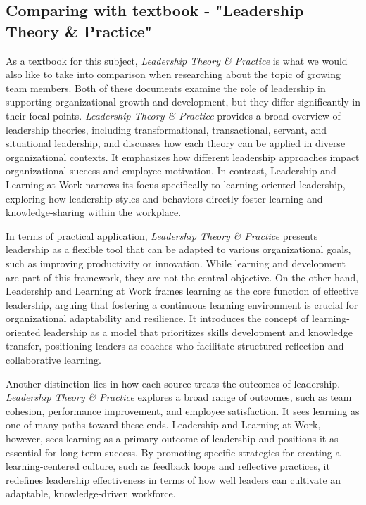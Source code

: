 \subsection{Comparing with textbook - "Leadership Theory \& Practice"}
As a textbook for this subject, \textit{Leadership Theory \& Practice} is what we would also like to
take into comparison when researching about the topic of growing team members. Both of these
documents examine the role of leadership in supporting organizational growth and development, but
they differ significantly in their focal points. \textit{Leadership Theory \& Practice} provides a
broad overview of leadership theories, including transformational, transactional, servant, and
situational leadership, and discusses how each theory can be applied in diverse organizational
contexts. It emphasizes how different leadership approaches impact organizational success and
employee motivation. In contrast, Leadership and Learning at Work narrows its focus specifically to
learning-oriented leadership, exploring how leadership styles and behaviors directly foster learning
and knowledge-sharing within the workplace.

In terms of practical application, \textit{Leadership Theory \& Practice} presents leadership as a
flexible tool that can be adapted to various organizational goals, such as improving productivity or
innovation. While learning and development are part of this framework, they are not the central
objective. On the other hand, Leadership and Learning at Work frames learning as the core function
of effective leadership, arguing that fostering a continuous learning environment is crucial for
organizational adaptability and resilience. It introduces the concept of learning-oriented
leadership as a model that prioritizes skills development and knowledge transfer, positioning
leaders as coaches who facilitate structured reflection and collaborative learning.

Another distinction lies in how each source treats the outcomes of leadership. \textit{Leadership
Theory \& Practice} explores a broad range of outcomes, such as team cohesion, performance
improvement, and employee satisfaction. It sees learning as one of many paths toward these ends.
Leadership and Learning at Work, however, sees learning as a primary outcome of leadership and
positions it as essential for long-term success. By promoting specific strategies for creating a
learning-centered culture, such as feedback loops and reflective practices, it redefines leadership
effectiveness in terms of how well leaders can cultivate an adaptable, knowledge-driven workforce.
